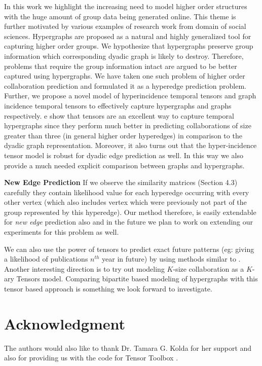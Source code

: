 \documentclass{sig-alternate}
\begin{document}
In this work we highlight the increasing need to model higher order structures with the huge amount of group data being generated online. This theme is further motivated by various examples of research work from domain of social sciences. Hypergraphs are proposed as a natural and highly generalized tool for capturing higher order groups. We hypothesize that hypergraphs preserve group information which corresponding dyadic graph is likely to destroy. Therefore, problems that require the group information intact are argued to be better captured using hypergraphs. We have taken one such problem of higher order collaboration prediction and formulated it as a hyperedge prediction problem. Further, we propose a novel model of hyperincidence temporal tensors and graph incidence temporal tensors to effectively capture hypergraphs and graphs respectively. e show that tensors are an excellent way to capture temporal hypergraphs since they perform much better in predicting collaborations of size greater than three (in general higher order hyperedges) in comparison to the dyadic graph representation. Moreover, it also turns out that the hyper-incidence tensor model is robust for dyadic edge prediction as well. In this way we also provide a much needed explicit comparison between graphs and hypergraphs. 

\textbf{New Edge Prediction} If we observe the similarity matrices (Section 4.3) carefully they contain likelihood value for each hyperedge occurring with every other vertex (which also includes vertex which were previously not part of the group represented by this hyperedge). Our method therefore, is easily extendable for \textit{new edge} prediction also and in the future we plan to work on extending our experiments for this problem as well. 

We can also use the power of tensors to predict exact future patterns (eg: giving a likelihood of publications $n^{th}$ year in future) by using methods similar to \cite{kolda11}. Another interesting direction is to try out modeling $K$-size collaboration as a $K$-ary Tensors model. Comparing bipartite based modeling of hypergraphs with this tensor based approach is something we look forward to investigate.


\section*{Acknowledgment}

The authors would also like to thank Dr. Tamara G. Kolda for her support and also for providing us with the code for Tensor Toolbox \cite{kolda07}. 


%


\end{document}
